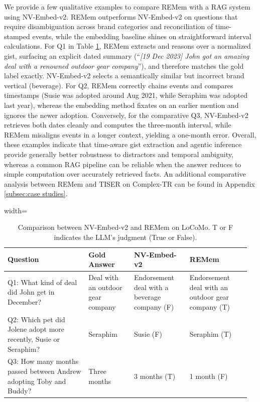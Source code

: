 \documentclass{article} %
\newcommand{\ours}{REMem\xspace}
\begin{document}
We provide a few qualitative examples to compare \ours with a RAG system using NV-Embed-v2.
\ours outperforms NV-Embed-v2 on questions that require disambiguation across brand categories and reconciliation of time-stamped events, while the embedding baseline shines on straightforward interval calculations. 
For Q1 in Table \ref{tab:nvembed_comparison}, \ours extracts and reasons over a normalized gist, surfacing an explicit dated summary (``\textit{[19 Dec 2023] John got an amazing deal with a renowned outdoor gear company}''), and therefore matches the gold label exactly. NV-Embed-v2 selects a semantically similar but incorrect brand vertical (beverage). 
For Q2, \ours correctly chains events and compares timestamps (Susie was adopted around Aug 2021, while Seraphim was adopted last year), whereas the embedding method fixates on an earlier mention and ignores the newer adoption. 
Conversely, for the comparative Q3, NV-Embed-v2 retrieves both dates cleanly and computes the three-month interval, while \ours misaligns events in a longer context, yielding a one-month error. 
Overall, these examples indicate that time-aware gist extraction and agentic inference provide generally better robustness to distractors and temporal ambiguity, whereas a common RAG pipeline can be reliable when the answer reduces to simple computation over accurately retrieved facts. 
An additional comparative analysis between \ours and TISER on Complex-TR can be found in Appendix \ref{subsec:case studies}.


\begin{table}[tb]
\caption{Comparison between NV-Embed-v2 and \ours on LoCoMo. T or F indicates the LLM’s judgment (True or False).}
\vspace{0.2em}
\label{tab:nvembed_comparison}
\centering
\setlength{\tabcolsep}{3pt}
\footnotesize
\begin{adjustbox}{width=\linewidth}
\small
\begin{tabular}{p{0.32\linewidth} p{0.18\linewidth} p{0.22\linewidth} p{0.24\linewidth}}
\toprule
\textbf{Question} & \textbf{Gold Answer} & \textbf{NV-Embed-v2} & \textbf{\ours} \\
\midrule
Q1: What kind of deal did John get in December? & Deal with an outdoor gear company & Endorsement deal with a beverage company (F) &
Endorsement deal with an outdoor gear company (T) \\\midrule
Q2: Which pet did Jolene adopt more recently, Susie or Seraphim? &
Seraphim & Susie (F) & Seraphim (T) \\\midrule
Q3: How many months passed between Andrew adopting Toby and Buddy? &
Three months & 3 months (T) & 1 month (F) \\
\bottomrule
\end{tabular}
\end{adjustbox}
\end{table}
\end{document}

